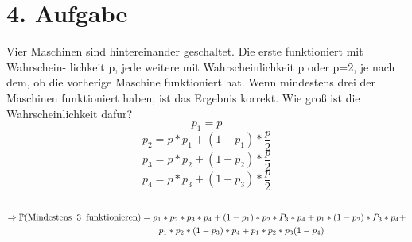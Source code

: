 \documentclass[10pt,a4paper,parskip=half]{scrartcl}
\begin{document}
\section*{4. Aufgabe}
Vier Maschinen sind hintereinander geschaltet. Die erste funktioniert mit Wahrschein-
lichkeit p, jede weitere mit Wahrscheinlichkeit p oder p=2, je nach dem, ob die vorherige
Maschine funktioniert hat. Wenn mindestens drei der Maschinen funktioniert haben, ist
das Ergebnis korrekt. Wie groß ist die Wahrscheinlichkeit dafur?
\\[1cm]
\begin{displaymath}
p_1 = p 
\end{displaymath}
\begin{displaymath}
p_2 = p * p_1 + (1-p_1)* \frac{p}{2} 
\end{displaymath}
\begin{displaymath}
p_3 = p * p_2 + (1-p_2)* \frac{p}{2} 
\end{displaymath}
\begin{displaymath}
p_4 = p * p_3 + (1-p_3)* \frac{p}{2} 
\end{displaymath}
\\[0.6cm]
\begin{align}
\Rightarrow \mathbb{P} (\text{Mindestens \medspace 3 \medspace funktionieren}) &=  p_1 * p_2 * p_3 * p_4 + (1-p_1)*p_2*P_3*p_4 + p_1*(1-p_2)*P_3*p_4 + \nonumber \\
 &\qquad {} p_1*p_2*(1-p_3)*p_4 + p_1*p_2*p_3(1-p_4) \nonumber
\end{align}
\end{document}
